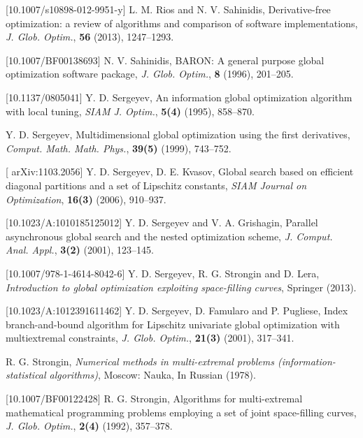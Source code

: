 \documentclass{aims}
\theoremstyle{definition}
\begin{document}
\begin{thebibliography}{10}
[10.1007/s10898-012-9951-y]
\newblock L. M. Rios and N. V. Sahinidis,
\newblock Derivative-free optimization: a review of algorithms and comparison of software implementations,
\newblock \emph{J. Glob. Optim.}, \textbf{56} (2013), 1247--1293.

[10.1007/BF00138693]
\newblock N. V. Sahinidis,
\newblock BARON: A general purpose global optimization software package,
\newblock \emph{J. Glob. Optim.}, \textbf{8} (1996), 201--205.

[10.1137/0805041]
\newblock Y. D. Sergeyev,
\newblock An information global optimization algorithm with local tuning,
\newblock \emph{SIAM J. Optim.}, \textbf{5(4)} (1995), 858--870.

\newblock Y. D. Sergeyev,
\newblock Multidimensional global optimization using the first derivatives,
\newblock \emph{Comput. Math. Math. Phys.}, \textbf{39(5)} (1999), 743--752.

[	arXiv:1103.2056]
\newblock Y. D. Sergeyev, D. E. Kvasov,
\newblock Global search based on efficient diagonal partitions and a set of Lipschitz constants,
\newblock \emph{SIAM Journal on Optimization}, \textbf{16(3)} (2006), 910--937.

[10.1023/A:1010185125012]
\newblock Y. D. Sergeyev and V. A. Grishagin,
\newblock Parallel asynchronous global search and the nested optimization scheme,
\newblock \emph{J. Comput. Anal. Appl.}, \textbf{3(2)} (2001), 123--145.

[10.1007/978-1-4614-8042-6]
\newblock Y. D. Sergeyev, R. G. Strongin and D. Lera,
\newblock \emph{Introduction to global optimization exploiting space-filling curves},
\newblock Springer (2013).

[10.1023/A:1012391611462]
\newblock Y. D. Sergeyev, D. Famularo and P. Pugliese,
\newblock Index branch-and-bound algorithm for Lipschitz univariate global optimization with multiextremal constraints,
\newblock \emph{J. Glob. Optim.}, \textbf{21(3)} (2001), 317--341.

\newblock R. G. Strongin,
\newblock \emph{Numerical methods in multi-extremal problems (information-statistical algorithms)},
\newblock Moscow: Nauka, In Russian (1978).

[10.1007/BF00122428]
\newblock R. G. Strongin,
\newblock Algorithms for multi-extremal mathematical programming problems employing a set of joint space-filling curves,
\newblock \emph{J. Glob. Optim.}, \textbf{2(4)} (1992), 357--378.


\end{thebibliography}
\end{document}

